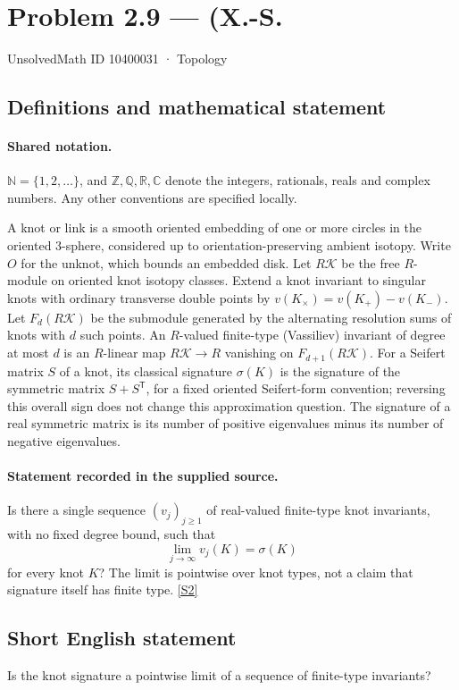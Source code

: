 \documentclass[11pt]{article}
\newcommand{\sref}[2]{\hyperlink{source:#1:#2}{[S#2]}}
\begin{document}
\setcounter{section}{10400030}
\section{Problem 2.9 — (X.-S.}\label{10400031}
{\small\sffamily UnsolvedMath ID 10400031 · Topology}
\subsection{Definitions and mathematical statement}

\paragraph{Shared notation.}$\mathbb N=\{1,2,\ldots\}$, and $\mathbb Z,\mathbb Q,\mathbb R,\mathbb C$ denote the integers, rationals, reals and complex numbers. Any other conventions are specified locally.


A knot or link is a smooth oriented embedding of one or more circles in the oriented $3$-sphere, considered up to orientation-preserving ambient isotopy. Write $O$ for the unknot, which bounds an embedded disk. Let $R\mathcal K$ be the free $R$-module on oriented knot isotopy classes. Extend a knot invariant to singular knots with ordinary transverse double points by $v(K_\times)=v(K_+)-v(K_-)$. Let $F_d(R\mathcal K)$ be the submodule generated by the alternating resolution sums of knots with $d$ such points. An $R$-valued finite-type (Vassiliev) invariant of degree at most $d$ is an $R$-linear map $R\mathcal K\to R$ vanishing on $F_{d+1}(R\mathcal K)$. For a Seifert matrix $S$ of a knot, its classical signature $\sigma(K)$ is the signature of the symmetric matrix $S+S^{\mathsf T}$, for a fixed oriented Seifert-form convention; reversing this overall sign does not change this approximation question. The signature of a real symmetric matrix is its number of positive eigenvalues minus its number of negative eigenvalues.
\paragraph{Statement recorded in the supplied source.}
Is there a single sequence $(v_j)_{j\ge1}$ of real-valued finite-type knot invariants, with no fixed degree bound, such that
\[\lim_{j\to\infty}v_j(K)=\sigma(K)\]
for every knot $K$? The limit is pointwise over knot types, not a claim that signature itself has finite type. \sref{10400031}{2}
\subsection{Short English statement}
Is the knot signature a pointwise limit of a sequence of finite-type invariants?
\end{document}
